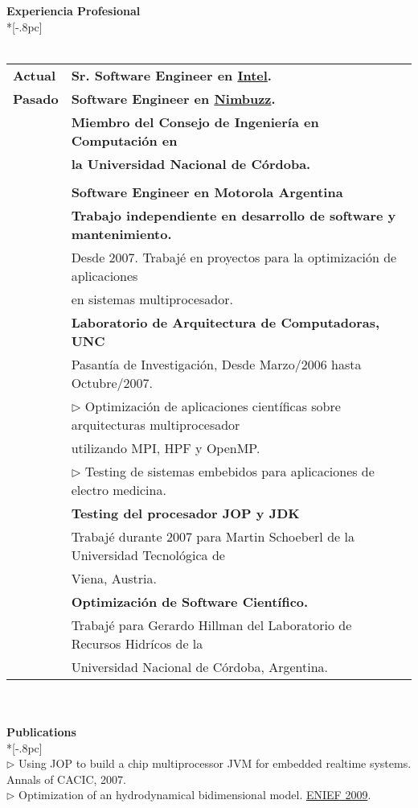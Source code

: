 \documentclass[a4paper,11pt,english]{article}
\begin{document}
{\large \bf Experiencia Profesional }\\*[-.8pc]
\underline{\hspace{6in}}
\\
\\
\begin{tabular}{ p{2cm} l }
  {\bf Actual}  & {\bf Sr. Software Engineer en \href{http://www.intel.com}{Intel}.}\\ 
				
  {\bf Pasado}& 	{\bf Software Engineer en \href{http://www.nimbuzz.com/en/about}{Nimbuzz}.}\\
			& 	{\bf Miembro del Consejo de Ingenier\'ia en Computaci\'on en } \\
			& 	{\bf la Universidad Nacional de C\'ordoba.}\\ \\
			& 	{\bf Software Engineer en Motorola Argentina}\\
			& 	{\bf Trabajo independiente en desarrollo de software y mantenimiento.}\\
			&	Desde 2007. Trabaj\'e en proyectos para la optimizaci\'on de aplicaciones\\
			& 	en sistemas multiprocesador.\\
			& 	{\bf Laboratorio de Arquitectura de Computadoras, UNC}\\
			& 	Pasant\'ia de Investigaci\'on, Desde Marzo/2006 hasta Octubre/2007.\\
			& 	$\triangleright$ Optimizaci\'on de aplicaciones cient\'ificas sobre arquitecturas multiprocesador\\
			& 	utilizando MPI, HPF y OpenMP.\\
			& 	$\triangleright$ Testing de sistemas embebidos para aplicaciones de electro medicina.\\
			& 	{\bf Testing del procesador JOP y JDK}\\
			& 	Trabaj\'e durante 2007 para Martin Schoeberl de la Universidad Tecnol\'ogica de\\
			&	Viena, Austria.\\
			& 	{\bf Optimizaci\'on de Software Cient\'ifico.}\\
			& 	Trabaj\'e para Gerardo Hillman del Laboratorio de Recursos Hidr\'icos de la \\
			& 	Universidad Nacional de C\'ordoba, Argentina.\\
				
\end{tabular} 
\\\\
{\bf Publications} \\*[-.8pc]
\underline{\hspace{6in}} \\
$\triangleright$ Using JOP to build a chip multiprocessor JVM for embedded realtime systems. Annals of CACIC, 2007.\\
$\triangleright$ Optimization of an hydrodynamical bidimensional model. \href{http://enief2009.pladema.net/index.html}{ENIEF 2009}. \\
\end{document}
